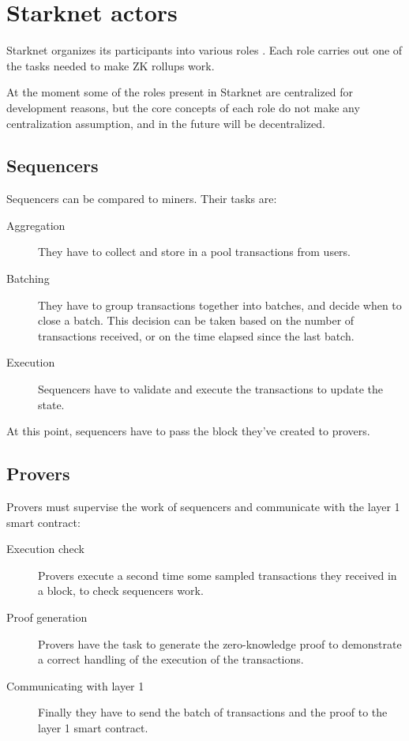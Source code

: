 \documentclass[12pt]{article}
\begin{document}
\section{Starknet actors} \label{section:starknet_actors}
Starknet organizes its participants into various roles \cite{starknet_actors}. Each role carries out one of the tasks needed to make ZK rollups work.

At the moment some of the roles present in Starknet are centralized for development reasons, but the core concepts of each role do not make any centralization assumption, and in the future will be decentralized.

\subsection{Sequencers} \label{subsection:sequencers}
Sequencers can be compared to miners. Their tasks are:
\begin{description}
    \item[Aggregation] They have to collect and store in a pool transactions from users.
    \item[Batching] They have to group transactions together into batches, and decide when to close a batch. This decision can be taken based on the number of transactions received, or on the time elapsed since the last batch.
    \item[Execution]Sequencers have to validate and execute the transactions to update the state.
\end{description}

At this point, sequencers have to pass the block they've created to provers.

\subsection{Provers} \label{subsection:provers}
Provers must supervise the work of sequencers and communicate with the layer 1 smart contract:
\begin{description}
    \item[Execution check] Provers execute a second time some sampled transactions they received in a block, to check sequencers work.
    \item[Proof generation] Provers have the task to generate the zero-knowledge proof to demonstrate a correct handling of the execution of the transactions.
    \item[Communicating with layer 1] Finally they have to send the batch of transactions and the proof to the layer 1 smart contract.
\end{description}
\end{document}

